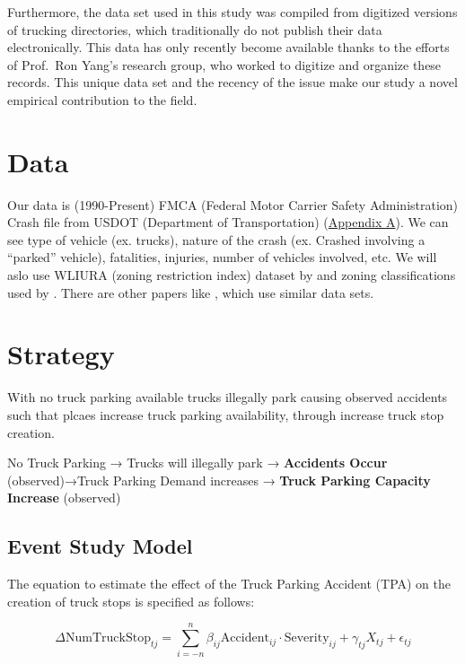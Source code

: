 \documentclass[
  12pt]{article}
\begin{document}
Furthermore, the data set used in this study was compiled from digitized
versions of trucking directories, which traditionally do not publish
their data electronically. This data has only recently become available
thanks to the efforts of Prof.~Ron Yang's research group, who worked to
digitize and organize these records. This unique data set and the
recency of the issue make our study a novel empirical contribution to
the field.

\section{Data}\label{data}

Our data is (1990-Present) FMCA (Federal Motor Carrier Safety
Administration) Crash file from USDOT (Department of Transportation)
(\label{sec:appendix-a}\hyperref[sec-a.-visualization-of-dataset.-]{Appendix
A}). We can see type of vehicle (ex. trucks), nature of the crash (ex.
Crashed involving a ``parked'' vehicle), fatalities, injuries, number of
vehicles involved, etc. We will aslo use WLIURA (zoning restriction
index) dataset by \citet{gyourkoNewMeasureLocal2008} and zoning
classifications used by \citet{puentesTraditionalReformedReview2006} .
There are other papers like \citet{liangSafetyInspectionsImprove2021},
which use similar data sets.

\section{\texorpdfstring{\textbf{Strategy}}{Strategy}}\label{strategy}

With no truck parking available trucks illegally park causing observed
accidents such that plcaes increase truck parking availability, through
increase truck stop creation.

No Truck Parking → Trucks will illegally park → \textbf{Accidents Occur}
(observed)→Truck Parking Demand increases → \textbf{Truck Parking
Capacity Increase} (observed)

\subsection{Event Study Model}\label{event-study-model}

The equation to estimate the effect of the Truck Parking Accident (TPA)
on the creation of truck stops is specified as follows:

\[
\Delta \text{NumTruckStop}_{tj} = \sum_{i=-n}^{n} \beta_{ij} \text{Accident}_{ij}\cdot \text{Severity}_{ij} + \gamma_{tj} X_{tj} + \epsilon_{tj}
\]
\end{document}
